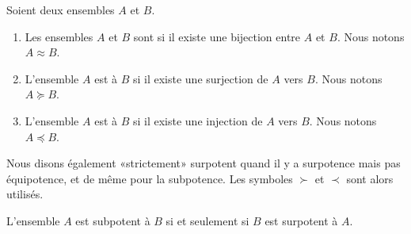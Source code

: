 \begin{definition}      \label{DEFooXGXZooIgcBCg}
	Soient deux ensembles \( A\) et \( B\).
	\begin{enumerate}
		\item
		      Les ensembles \( A\) et \( B\) sont  si il existe une bijection entre \( A\) et \( B\). Nous notons \( A\approx B\).
		\item
		      L'ensemble \( A\) est  à \( B\) si il existe une surjection de \( A\) vers \( B\). Nous notons \( A\succeq B\).
		\item
		      L'ensemble \( A\) est  à \( B\) si il existe une injection de \( A\) vers \( B\). Nous notons \( A\preceq B\).
	\end{enumerate}
	Nous disons également «strictement» surpotent quand il y a surpotence mais pas équipotence, et de même pour la subpotence. Les symboles \( \succ\) et \( \prec\) sont alors utilisés.
\end{definition}

\begin{proposition}      \label{PROPooWSXTooMQPcNG}
	L'ensemble \( A\) est subpotent à \( B\) si et seulement si \( B\) est surpotent à \( A\).
\end{proposition}

